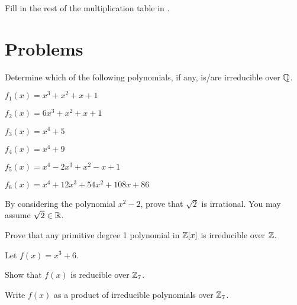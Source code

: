 \begin{exercise}\label{exercise-fill-in-missing-elements-in-table-of-Z3/<x^2+1>}
    Fill in the rest of the multiplication table in .
\end{exercise}

\newpage

\section{Problems}
\begin{problem}
    Determine which of the following polynomials, if any, is/are irreducible over $\mathbb{Q}$.
    \begin{multicols}{2}
        \begin{partquestions}{\alph*}
            \item $f_1(x) = x^3 + x^2 + x + 1$
            \item $f_2(x) = 6x^3 + x^2 + x + 1$
            \item $f_3(x) = x^4 + 5$
            \item $f_4(x) = x^4 + 9$
            \item $f_5(x) = x^4 - 2x^3 + x^2 - x + 1$
            \item $f_6(x) = x^4 + 12x^3 + 54x^2 + 108x + 86$
        \end{partquestions}
    \end{multicols}
\end{problem}

\begin{problem}
    By considering the polynomial $x^2 - 2$, prove that $\sqrt2$ is irrational. You may assume $\sqrt2 \in \mathbb{R}$.
\end{problem}

\begin{problem}\label{problem-primitive-degree-1-polynomial-in-Z[x]-is-irreducible}
    Prove that any primitive degree 1 polynomial in $\mathbb{Z}[x]$ is irreducible over $\mathbb{Z}$.
\end{problem}

\begin{problem}
    Let $f(x) = x^3 + 6$.
    \begin{partquestions}{\roman*}
        \item Show that $f(x)$ is reducible over $\mathbb{Z}_7$.
        \item Write $f(x)$ as a product of irreducible polynomials over $\mathbb{Z}_7$.
    \end{partquestions}
\end{problem}

